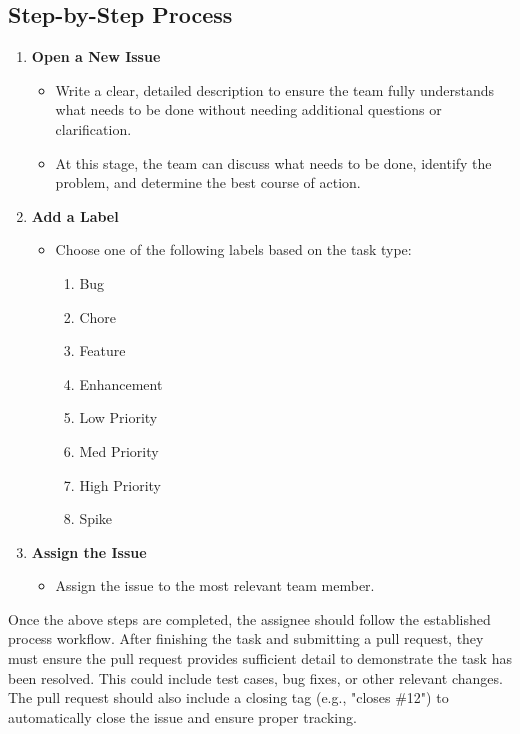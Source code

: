 \documentclass{article}
\begin{document}
\subsection*{Step-by-Step Process}

\begin{enumerate}
    \item \textbf{Open a New Issue}
    \begin{itemize}
        \item Write a clear, detailed description to ensure the team fully understands what needs to 
        be done without needing additional questions or clarification.
        \item At this stage, the team can discuss what needs to be done, identify the problem, 
        and determine the best course of action.
    \end{itemize}

    \item \textbf{Add a Label}
    \begin{itemize}
        \item Choose one of the following labels based on the task type:
        \begin{enumerate}
            \item Bug
            \item Chore
            \item Feature
            \item Enhancement
            \item Low Priority
            \item Med Priority
            \item High Priority
            \item Spike
        \end{enumerate}
    \end{itemize}

    \item \textbf{Assign the Issue}
    \begin{itemize}
        \item Assign the issue to the most relevant team member.
    \end{itemize}
\end{enumerate}

Once the above steps are completed, the assignee should follow the established 
process workflow. After finishing the task and submitting a pull request, they 
must ensure the pull request provides sufficient detail to demonstrate the task 
has been resolved. This could include test cases, bug fixes, or other relevant 
changes. The pull request should also include a closing tag (e.g., "closes \#12") 
to automatically close the issue and ensure proper tracking.
\end{document}
